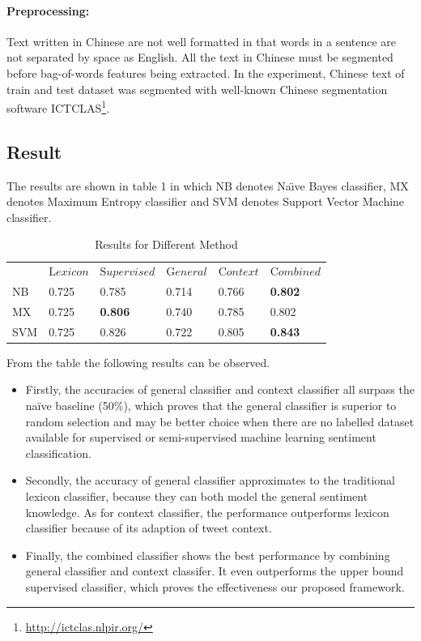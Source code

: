 \documentclass{llncs}
\begin{document}
\paragraph{Preprocessing:}
Text written in Chinese are not well formatted in that words in a sentence are not separated by space as English. 
All the text in Chinese must be segmented before bag-of-words features being extracted. 
In the experiment, Chinese text of train and test dataset was segmented with well-known Chinese segmentation software ICTCLAS\footnote{\url{http://ictclas.nlpir.org/}}.
\subsection{Result}
The results are shown in table 1 in which NB denotes Na\"\i ve Bayes classifier, MX denotes Maximum Entropy classifier and SVM denotes Support Vector Machine classifier. 
\begin{table}
\caption{Results for Different Method}
\begin{center}
\renewcommand{\arraystretch}{1.4}
\setlength\tabcolsep{3pt}
\begin{tabular}{llllll}
\hline\noalign{\bigskip}
   & ${\mathrm Lexicon}$ & ${\mathrm Supervised}$ & 
  ${\mathrm General}$ & ${\mathrm Context}$ & ${\mathrm Combined}$ \\
\noalign{\bigskip}
\hline
\noalign{\bigskip}
 NB & 0.725 & 0.785 & 0.714 & 0.766 & \textbf{0.802}   \\
 MX & 0.725 & \textbf{0.806} & 0.740 & 0.785 & 0.802  \\
 SVM & 0.725 & 0.826 & 0.722 & 0.805 & \textbf{0.843} \\
\hline
\end{tabular}
\end{center}
\end{table}
From the table the following results can be observed.
\begin{itemize}
\item Firstly, the accuracies of general classifier and context classifier all surpass the naïve baseline (50\%), which proves that the general classifier is superior to random selection and may be better choice when there are no labelled dataset available for supervised or semi-supervised machine learning sentiment classification.
\item Secondly, the accuracy of general classifier approximates to the traditional lexicon classifier, because they can both model the general sentiment knowledge. 
As for context classifier, the performance outperforms lexicon classifier because of its adaption of tweet context.
\item Finally, the combined classifier shows the best performance by combining general classifier and context classifer. 
It even outperforms the upper bound supervised classifier, which proves the effectiveness our proposed framework.
\end{itemize}
\end{document}

